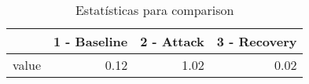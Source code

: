 \begin{table}[htbp]
\caption{Estatísticas para comparison}
\label{tab:comparison_medians}
\begin{tabular}{lrrr}
\toprule
 & 1 - Baseline & 2 - Attack & 3 - Recovery \\
\midrule
value & 0.12 & 1.02 & 0.02 \\
\bottomrule
\end{tabular}
\end{table}
